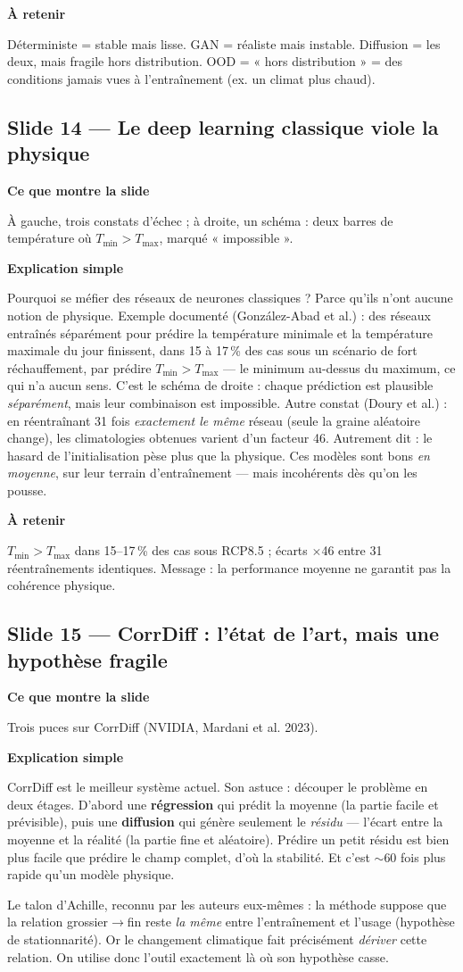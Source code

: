 \documentclass[11pt,a4paper]{article}
\newcommand{\slide}[2]{\subsection*{\textcolor{bleu}{Slide #1 --- #2}}}
\newcommand{\bloc}[1]{\par\medskip\noindent\textcolor{accent}{\textbf{#1}}\par\nopagebreak\smallskip}
\begin{document}
\bloc{À retenir}
Déterministe = stable mais lisse. GAN = réaliste mais instable. Diffusion = les deux, mais fragile hors distribution. OOD = « hors distribution » = des conditions jamais vues à l'entraînement (ex. un climat plus chaud).

\slide{14}{Le deep learning classique viole la physique}

\bloc{Ce que montre la slide}
À gauche, trois constats d'échec ; à droite, un schéma : deux barres de température où $T_{\min} > T_{\max}$, marqué « impossible ».

\bloc{Explication simple}
Pourquoi se méfier des réseaux de neurones classiques ? Parce qu'ils n'ont aucune notion de physique. Exemple documenté (González-Abad et al.) : des réseaux entraînés séparément pour prédire la température minimale et la température maximale du jour finissent, dans 15 à 17\,\% des cas sous un scénario de fort réchauffement, par prédire $T_{\min} > T_{\max}$ --- le minimum au-dessus du maximum, ce qui n'a aucun sens. C'est le schéma de droite : chaque prédiction est plausible \emph{séparément}, mais leur combinaison est impossible. Autre constat (Doury et al.) : en réentraînant 31 fois \emph{exactement le même} réseau (seule la graine aléatoire change), les climatologies obtenues varient d'un facteur 46. Autrement dit : le hasard de l'initialisation pèse plus que la physique. Ces modèles sont bons \emph{en moyenne}, sur leur terrain d'entraînement --- mais incohérents dès qu'on les pousse.

\bloc{À retenir}
$T_{\min} > T_{\max}$ dans 15--17\,\% des cas sous RCP8.5 ; écarts $\times$46 entre 31 réentraînements identiques. Message : la performance moyenne ne garantit pas la cohérence physique.

\slide{15}{CorrDiff : l'état de l'art, mais une hypothèse fragile}

\bloc{Ce que montre la slide}
Trois puces sur CorrDiff (NVIDIA, Mardani et al. 2023).

\bloc{Explication simple}
CorrDiff est le meilleur système actuel. Son astuce : découper le problème en deux étages. D'abord une \textbf{régression} qui prédit la moyenne (la partie facile et prévisible), puis une \textbf{diffusion} qui génère seulement le \emph{résidu} --- l'écart entre la moyenne et la réalité (la partie fine et aléatoire). Prédire un petit résidu est bien plus facile que prédire le champ complet, d'où la stabilité. Et c'est $\sim$60 fois plus rapide qu'un modèle physique.

Le talon d'Achille, reconnu par les auteurs eux-mêmes : la méthode suppose que la relation grossier$\to$fin reste \emph{la même} entre l'entraînement et l'usage (hypothèse de stationnarité). Or le changement climatique fait précisément \emph{dériver} cette relation. On utilise donc l'outil exactement là où son hypothèse casse.
\end{document}
